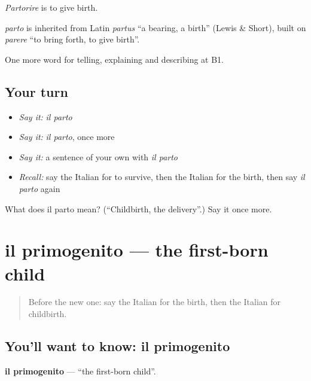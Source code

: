 \emph{Partorire} is to give birth.

\begin{cousinweb}
\emph{parto} is inherited from Latin \emph{partus} \textquotedblleft{}a bearing, a birth\textquotedblright{} (Lewis \& Short), built on \emph{parere} \textquotedblleft{}to bring forth, to give birth\textquotedblright{}.
\end{cousinweb}

\begin{grammarlens}[title={What you've built}]
One more word for telling, explaining and describing at B1.
\end{grammarlens}

\subsection*{Your turn}
\begin{itemize}
\raggedright
  \item \emph{Say it:} \emph{il parto}
  \item \emph{Say it:} \emph{il parto}, once more
  \item \emph{Say it:} a sentence of your own with \emph{il parto}
  \item \emph{Recall:} say the Italian for to survive, then the Italian for the birth, then say \emph{il parto} again
\end{itemize}

\begin{tcolorbox}[breakable,colback=teal!4,colframe=teal!35!black,title={Before you move on}]
What does il parto mean? (\textquotedblleft{}Childbirth, the delivery\textquotedblright{}.) Say it once more.
\end{tcolorbox}
\section[il primogenito]{il primogenito — the first-born child}

\label{lesson:IT-C307-primogenito}



\begin{quote}
Before the new one: say the Italian for the birth, then the Italian for childbirth.
\end{quote}

\subsection*{You'll want to know: il primogenito}
\textbf{il primogenito} — \textquotedblleft{}the first-born child\textquotedblright{}.

